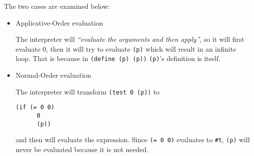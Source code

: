 \documentclass[a4paper, titlepage, twoside]{article}
\begin{document}
The two cases are examined below:

\begin{itemize}
\item Applicative-Order evaluation

The interpreter will \emph{``evaluate the arguments and then apply''}, so it will first evaluate 0, then it will try to evaluate \texttt{(p)} which will result in an infinite loop. That is because in \texttt{(define (p) (p))} \texttt{(p)}'s definition is itself.

\item Normal-Order evaluation

The interpreter will transform \texttt{(test 0 (p))} to

\begin{verbatim}
(if (= 0 0)
      0
      (p))
\end{verbatim}

and then will evaluate the expression. Since \texttt{(= 0 0)} evaluates to \texttt{#t}, \texttt{(p)} will never be evaluated because it is not needed.
\end{itemize}
\end{document}
